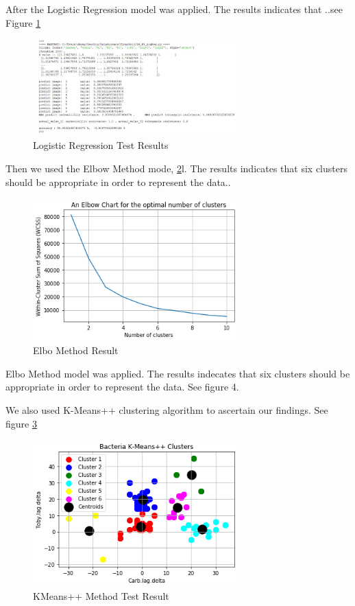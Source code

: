\documentclass[conference]{IEEEtran}
\begin{document}
After the Logistic Regression model was applied. The results indicates that ..see Figure \ref{LogRegTestResult}

\begin{figure}[h]
\centering
\includegraphics[width=8cm]{LogisticReg_Result1}
\caption{Logistic  Regression Test Results}
\label{LogRegTestResult}
\end{figure}


Then we used the Elbow Method mode,  \ref{ElboResult}l. The results indicates that six clusters should be appropriate in order to represent the data..

\begin{figure}[h]
\centering
\includegraphics[width=8cm]{ElbowChart1.png}
\caption{Elbo Method  Result}
\label{ElboResult}
\end{figure}


Elbo Method model was applied. The results indecates that six clusters should be appropriate in order to represent the data. See figure 4.

We also used K-Means++ clustering algorithm to ascertain our findings. See figure \ref{KMeansResult}

\begin{figure}[h]
\centering
\includegraphics[width=8cm]{KMeansPP1.png}
\caption{KMeans++  Method  Test Result}
\label{KMeansResult}
\end{figure} 
\end{document}
